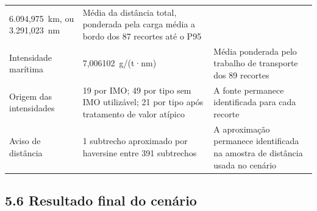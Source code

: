 \documentclass[brazil,]{article}
\let\oldsubsection\subsection
\renewcommand{\subsection}{\Needspace{12\baselineskip}\oldsubsection}
\begin{document}
\begin{longtable}[]{@{}lll@{}}
\begin{minipage}[t]{0.30\columnwidth}
6.094,975~km, ou 3.291,023~nm\strut
\end{minipage} & \begin{minipage}[t]{0.30\columnwidth}\raggedright
Média da distância total, ponderada pela carga média a bordo dos 87
recortes até o P95\strut
\end{minipage}\tabularnewline
\begin{minipage}[t]{0.30\columnwidth}\raggedright
Intensidade marítima\strut
\end{minipage} & \begin{minipage}[t]{0.30\columnwidth}\raggedright
7,006102~g/(t·nm)\strut
\end{minipage} & \begin{minipage}[t]{0.30\columnwidth}\raggedright
Média ponderada pelo trabalho de transporte dos 89 recortes\strut
\end{minipage}\tabularnewline
\begin{minipage}[t]{0.30\columnwidth}\raggedright
Origem das intensidades\strut
\end{minipage} & \begin{minipage}[t]{0.30\columnwidth}\raggedright
19 por IMO; 49 por tipo sem IMO utilizável; 21 por tipo após tratamento
de valor atípico\strut
\end{minipage} & \begin{minipage}[t]{0.30\columnwidth}\raggedright
A fonte permanece identificada para cada recorte\strut
\end{minipage}\tabularnewline
\begin{minipage}[t]{0.30\columnwidth}\raggedright
Aviso de distância\strut
\end{minipage} & \begin{minipage}[t]{0.30\columnwidth}\raggedright
1 subtrecho aproximado por haversine entre 391 subtrechos\strut
\end{minipage} & \begin{minipage}[t]{0.30\columnwidth}\raggedright
A aproximação permanece identificada na amostra de distância usada no
cenário\strut
\end{minipage}\tabularnewline
\bottomrule
\end{longtable}

\hypertarget{resultado-final-do-cenuxe1rio}{%
\subsection{5.6 Resultado final do
cenário}\label{resultado-final-do-cenuxe1rio}}
\end{document}
